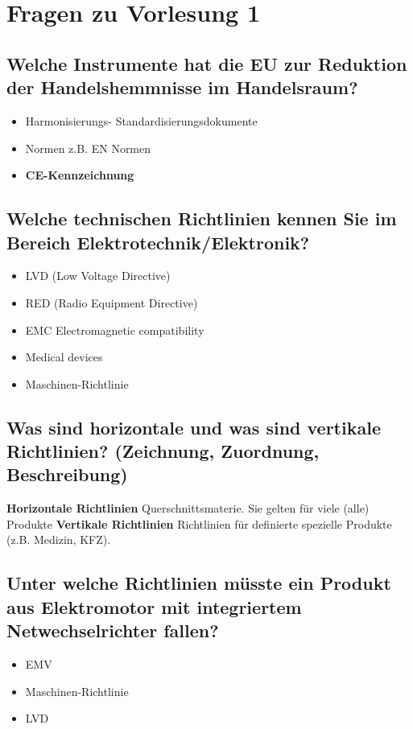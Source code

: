 \section{Fragen zu Vorlesung 1}
\subsection{Welche Instrumente hat die EU zur Reduktion der Handelshemmnisse im Handelsraum?}
\begin{itemize}
  \item Harmonisierungs- Standardisierungsdokumente
  \item Normen z.B. EN Normen
  \item \textbf{CE-Kennzeichnung}
\end{itemize}

\subsection{Welche technischen Richtlinien kennen Sie im Bereich Elektrotechnik/Elektronik?}
\begin{itemize}
  \item LVD (Low Voltage Directive)
  \item RED (Radio Equipment Directive)
  \item EMC {Electromagnetic compatibility}
  \item Medical devices
  \item Maschinen-Richtlinie
\end{itemize}

\subsection{Was sind horizontale und was sind vertikale Richtlinien? (Zeichnung, Zuordnung, Beschreibung)}
\textbf{Horizontale Richtlinien}\p
Querschnittsmaterie. Sie gelten für viele (alle) Produkte\p
%
\textbf{Vertikale Richtlinien}\p
Richtlinien für definierte spezielle Produkte (z.B. Medizin, KFZ).

\subsection{Unter welche Richtlinien müsste ein Produkt aus Elektromotor mit integriertem Netwechselrichter fallen?}
\begin{itemize}
  \item EMV
  \item Maschinen-Richtlinie
  \item LVD
\end{itemize}

